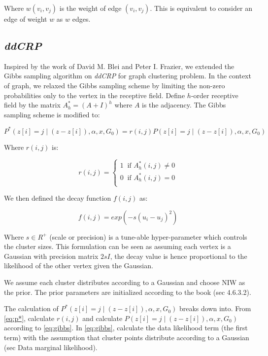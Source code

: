 Where $w(v_i, v_j)$ is the weight of edge $(v_i, v_j)$. This is equivalent to consider an edge of weight $w$ as $w$ edges.

\newpage
\subsection{\emph{ddCRP}}

Inspired by the work of  David  M.  Blei  and  Peter  I.  Frazier, we extended the Gibbs sampling algorithm on \emph{ddCRP} for graph clustering problem. In the context of graph, we relaxed the Gibbs sampling scheme by limiting the non-zero probabilities only to the vertex in the receptive field. Define $h$-order receptive field by the matrix $A^*_h = (A+I)^h$ where $A$ is the adjacency. The Gibbs sampling scheme is modified to:

\begin{equation}
    P^*(z[i] = j \;|\; (z - z[i]), \alpha, x, G_0) = r(i, j)P(z[i] = j \;|\; (z - z[i]), \alpha, x, G_0)
    \label{eq:p*}
\end{equation}

Where $r(i, j)$ is:

\begin{equation}
     r(i, j) = \left\{
    \begin{array}{ll}
        1 \;\; \text{if $A^*_h(i, j) \neq 0$}\\
        0 \;\; \text{if $A^*_h(i, j) = 0$}\\
    \end{array}
    \right.
\end{equation}

We then defined the decay function $f(i, j)$ as:

\begin{equation}
    f(i, j) = exp(- s(u_i - u_j)^2)
\end{equation}

Where $s \in R^+$ (scale or precision) is a tune-able hyper-parameter which controls the cluster sizes. This formulation can be seen as assuming each vertex is a Gaussian with precision matrix $2sI$, the decay value is hence proportional to the likelihood of the other vertex given the Gaussian.

We assume each cluster distributes according to a Gaussian and choose NIW as the prior. The prior parameters are initialized according to the book \cite{murphy2012machine} (sec 4.6.3.2).

The calculation of $P^*(z[i] = j \;|\; (z - z[i]), \alpha, x, G_0)$ breaks down into. From \ref{eq:p*}, calculate $r(i, j)$ and calculate $P(z[i] = j \;|\; (z - z[i]), \alpha, x, G_0)$ according to \ref{eq:gibbs}. In \ref{eq:gibbs}, calculate the data likelihood term (the first term) with the assumption that cluster points distribute according to a Gaussian (sec Data marginal likelihood).

